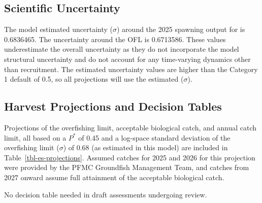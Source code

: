 \documentclass[
]{scrartcl}
\begin{document}
\subsection{Scientific Uncertainty}\label{scientific-uncertainty}

The model estimated uncertainty (\(\sigma\)) around the 2025 spawning
output for is 0.6836465. The uncertainty around the OFL is 0.6713586.
These values underestimate the overall uncertainty as they do not
incorporate the model structural uncertainty and do not account for any
time-varying dynamics other than recruitment. The estimated uncertainty
values are higher than the Category 1 default of 0.5, so all projections
will use the estimated (\(\sigma\)).

\subsection{Harvest Projections and Decision
Tables}\label{harvest-projections-and-decision-tables}

Projections of the overfishing limit, acceptable biological catch, and
annual catch limit, all based on a \(P^*\) of 0.45 and a log-space
standard deviation of the overfishing limit (\(\sigma\)) of 0.68 (as
estimated in this model) are included in Table~\ref{tbl-es-projections}.
Assumed catches for 2025 and 2026 for this projection were provided by
the PFMC Groundfish Management Team, and catches from 2027 onward assume
full attainment of the acceptable biological catch.

No decision table needed in draft assessments undergoing review.
\end{document}
